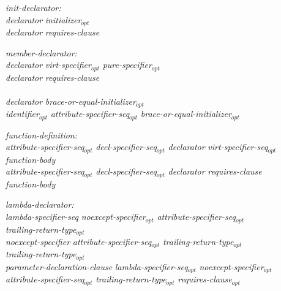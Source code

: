\begin{adjustwidth}{0.5cm}{0.5cm}

\emph{init-declarator:} \\
\phantom{~~~}\emph{declarator} \emph{initializer}$_{opt}$ \\
\phantom{~~~}\emph{declarator} \emph{requires-clause} \\
\phantom{~~~}

\emph{member-declarator:} \\
\phantom{~~~}\emph{declarator} \emph{virt-specifier}$_{opt}$  \emph{pure-specifier}$_{opt}$\\
\phantom{~~~}\emph{declarator} \emph{requires-clause} \\
\phantom{~~~} \\
\phantom{~~~}\emph{declarator} \emph{brace-or-equal-initializer}$_{opt}$ \\
\phantom{~~~}\emph{identifier}$_{opt}$ \emph{attribute-specifier-seq}$_{opt}$ \tcode{:} \emph{brace-or-equal-initializer}$_{opt}$

\emph{function-definition:} \\
\phantom{~~~}\emph{attribute-specifier-seq}$_{opt}$ \emph{decl-specifier-seq}$_{opt}$ \emph{declarator} \emph{virt-specifier-seq}$_{opt}$  \\
\phantom{~~~~~~} \emph{function-body}\\
\phantom{~~~}\emph{attribute-specifier-seq}$_{opt}$ \emph{decl-specifier-seq}$_{opt}$ \emph{declarator} \emph{requires-clause} \\ 
\phantom{~~~~~~} \emph{function-body}

\emph{lambda-declarator:} \\
\phantom{~~~}\emph{lambda-specifier-seq} \emph{noexcept-specifier}$_{opt}$ \emph{attribute-specifier-seq}$_{opt}$ \\
\phantom{~~~~~~}\emph{trailing-return-type}$_{opt}$ \\
\phantom{~~~}\emph{noexcept-specifier} \emph{attribute-specifier-seq}$_{opt}$ \emph{trailing-return-type}$_{opt}$  \\
\phantom{~~~}\emph{trailing-return-type}$_{opt}$ \\
\phantom{~~~}\tcode{(} \emph{parameter-declaration-clause} \tcode{)} \emph{lambda-specifier-seq}$_{opt}$ \emph{noexcept-specifier}$_{opt}$ \\ \phantom{~~~~~~}\emph{attribute-specifier-seq}$_{opt}$ \emph{trailing-return-type}$_{opt}$ \emph{requires-clause}$_{opt}$ 


\end{adjustwidth}
